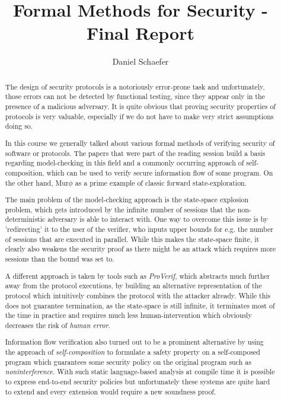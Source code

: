 \documentclass[a4paper,UKenglish]{lipics-v2018}
\title{Formal Methods for Security - Final Report}
\author{Daniel Schaefer}{2549458}{}{}{}
\def\murphi{Mur$\phi$ }
\begin{document}
\maketitle

\begin{abstract}


The design of security protocols is a notoriously error-prone task and unfortunately, those errors can not be detected by functional testing, since they appear only in the presence of a malicious adversary. It is quite obvious that proving security properties of protocols is very valuable, especially if we do not have to make very strict assumptions doing so.

In this course we generally talked about various formal methods of verifying security of software or protocols. The papers that were part of the reading session build a basis regarding model-checking in this field and a commonly occurring approach of self-composition, which can be used to verify secure information flow of some program. On the other hand, \murphi as a prime example of classic forward state-exploration.

The main problem of the model-checking approach is the state-space explosion problem, which gets introduced by the infinite number of sessions that the non-deterministic adversary is able to interact with. One way to overcome this issue is by 'redirecting' it to the user of the verifier, who inputs upper bounds for e.g. the number of sessions that are executed in parallel. While this makes the state-space finite, it clearly also weakens the security proof as there might be an attack which requires more sessions than the bound was set to.

A different approach is taken by tools such as \textit{ProVerif}, which abstracts much further away from the protocol executions, by building an alternative representation of the protocol which intuitively combines the protocol with the attacker already. While this does not guarantee termination, as the state-space is still infinite, it terminates most of the time in practice and requires much less human-intervention which obviously decreases the risk of \textit{human error}.

Information flow verification also turned out to be a prominent alternative by using the approach of \textit{self-composition} to formulate a safety property on a self-composed program which guarantees some security policy on the original program such as \textit{noninterference}. With such static language-based analysis at compile time it is possible to express end-to-end security policies but unfortunately these systems are quite hard to extend and every extension would require a new soundness proof.


\end{abstract}
\end{document}
